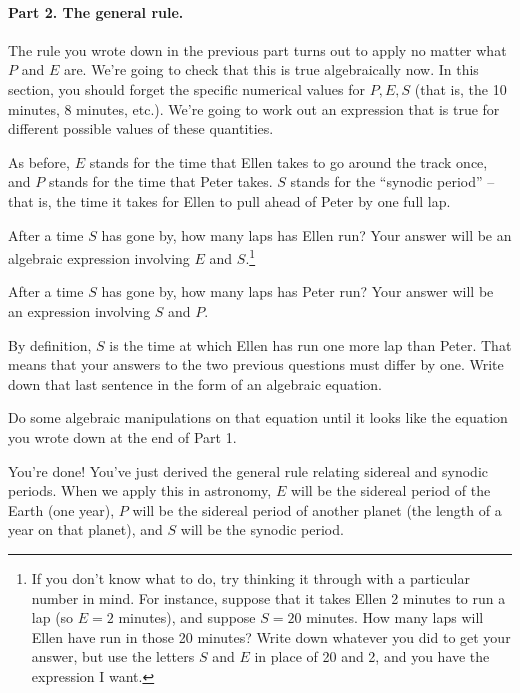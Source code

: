 \answerspace{2in}


\paragraph{Part 2. The general rule.}
The rule you wrote down in the previous part turns out to apply
no matter what $P$ and $E$ are. We're going to check that this
is true algebraically now. In this section, you should forget 
the specific numerical values for $P,E,S$ (that is, the 10 minutes, 8 minutes,
etc.). We're going to work out an expression that is true
for different possible values of these quantities.

As before, $E$ stands for the time that Ellen takes to go around
the track once, and $P$ stands for the time that Peter takes. $S$
stands for the ``synodic period'' -- that is, the time it takes for
Ellen to pull ahead of Peter by one full lap.

After a time $S$ has gone by, how many laps has Ellen run? Your
answer will be an algebraic expression involving $E$ and $S$.\footnote{If
you don't know what to do, try thinking it through with a particular
number in mind. For instance, suppose that it takes Ellen 2 minutes
to run a lap (so $E=2$ minutes), and suppose $S=20$ minutes. How
many laps will Ellen have run in those 20 minutes? 
Write down whatever you did to get your answer, but use the letters
$S$ and $E$ in place of 20 and 2, and you have the expression I want.}

\answerspace{1.5in}

After a time $S$ has gone by, how many laps has Peter run?
Your answer will be an expression involving $S$ and $P$. 

\answerspace{1.5in}

\pagebreak[4]

By definition, $S$ is the time at which Ellen has run one more
lap than Peter. That means that your answers to the two previous
questions must differ by one. Write down that last sentence in
the form of an algebraic equation.

\answerspace{1in}

Do some algebraic manipulations on that equation until
it looks like the equation you wrote down at the end of Part 1.



\vfil

You're done! You've just derived the general rule relating sidereal
and synodic periods. When we apply this in astronomy, $E$ will
be the sidereal period of the Earth (one year), $P$ will be the sidereal
period of another planet (the length of a year on that planet), and 
$S$ will be the synodic period.

